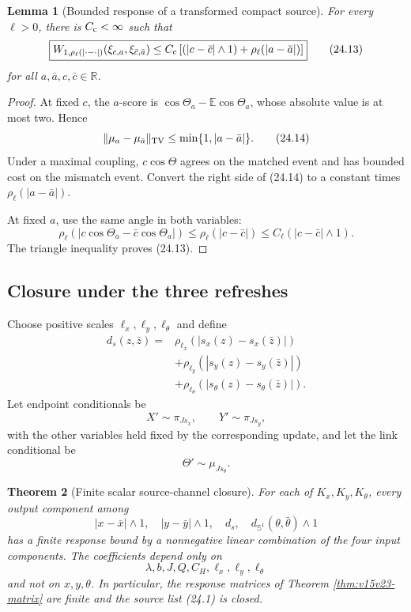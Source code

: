 \documentclass[11pt]{article}
\newtheorem{theorem}{Theorem}[section]
\newtheorem{lemma}[theorem]{Lemma}
\theoremstyle{remark}
\begin{document}
\begin{lemma}[Bounded response of a transformed compact source]
\label{lem:v15v24-compact-transform}
For every \(\ell>0\), there is \(C_{\rm c}<\infty\) such that
\[
\boxed{
 W_{1,\rho_\ell(|\cdot-\cdot|)}
 (\xi_{c,a},\xi_{\bar c,\bar a})
 \le C_{\rm c}\left[
 (|c-\bar c|\wedge1)+
 \rho_\ell(|a-\bar a|)
 \right]}                                                   \tag{24.13}
\]
for all \(a,\bar a,c,\bar c\in\mathbb R\).
\end{lemma}

\begin{proof}
At fixed \(c\), the \(a\)-score is
\(\cos\Theta_a-\mathbb E\cos\Theta_a\), whose absolute value is
at most two.  Hence
\[
 \|\mu_a-\mu_{\bar a}\|_{\rm TV}
 \le\min\{1,|a-\bar a|\}.                                   \tag{24.14}
\]
Under a maximal coupling, \(c\cos\Theta\) agrees on the matched
event and has bounded cost on the mismatch event.  Convert the
right side of (24.14) to a constant times
\(\rho_\ell(|a-\bar a|)\).

At fixed \(a\), use the same angle in both variables:
\[
 \rho_\ell(
 |c\cos\Theta_a-\bar c\cos\Theta_a|)
 \le\rho_\ell(|c-\bar c|)
 \le C_\ell(|c-\bar c|\wedge1).                             \tag{24.15}
\]
The triangle inequality proves (24.13).
\end{proof}

\subsection{Closure under the three refreshes}

Choose positive scales \(\ell_x,\ell_y,\ell_\theta\) and define
\[
\begin{aligned}
 d_s(z,\bar z)
 ={}&
 \rho_{\ell_x}(|s_x(z)-s_x(\bar z)|)\\
 &+\rho_{\ell_y}(|s_y(z)-s_y(\bar z)|)\\
 &+\rho_{\ell_\theta}(|s_\theta(z)-s_\theta(\bar z)|).
                                                               \tag{24.16}
\end{aligned}
\]
Let endpoint conditionals be
\[
 X'\sim\pi_{J s_x},\qquad
 Y'\sim\pi_{J s_y},                                        \tag{24.17}
\]
with the other variables held fixed by the corresponding update,
and let the link conditional be
\[
 \Theta'\sim\mu_{J s_\theta}.                              \tag{24.18}
\]

\begin{theorem}[Finite scalar source-channel closure]
\label{thm:v15v24-closure}
For each of \(K_x,K_y,K_\theta\), every output component among
\[
 |x-\bar x|\wedge1,\quad
 |y-\bar y|\wedge1,\quad
 d_s,\quad
 d_{\mathbb S^1}(\theta,\bar\theta)\wedge1                 \tag{24.19}
\]
has a finite response bound by a nonnegative linear combination
of the four input components.  The coefficients depend only on
\[
 \lambda,b,J,Q,C_H,\ell_x,\ell_y,\ell_\theta               \tag{24.20}
\]
and not on \(x,y,\theta\).  In particular, the response matrices
of Theorem \ref{thm:v15v23-matrix} are finite and the source list
(24.1) is closed.
\end{theorem}
\end{document}
